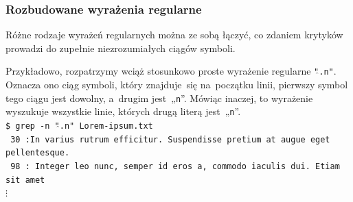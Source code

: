 \documentclass[10pt,t]{beamer}
\begin{document}
\begin{frame}
  \frametitle{Rozbudowane wyrażenia regularne}


  Różne rodzaje wyrażeń regularnych można ze sobą łączyć, co zdaniem
  krytyków prowadzi do zupełnie niezrozumiałych ciągów symboli.

  Przykładowo, rozpatrzymy wciąż stosunkowo proste wyrażenie regularne
  \texttt{"\hspace{0.2em}$\hat{}$\hspace{0.1em}.n"}. Oznacza ono ciąg
  symboli, który znajduje~się na~początku linii, pierwszy symbol tego ciągu
  jest dowolny, a~drugim jest~„\texttt{n}”. Mówiąc inaczej, to wyrażenie
  wyszukuje wszystkie linie, których drugą literą jest~„\texttt{n}”. \\
  \texttt{\$ grep -n "\hspace{0.2em}$\hat{}$\hspace{0.1em}.n"{}
    Lorem-ipsum.txt} \\
  \texttt{{\color{green} 30}{\color{jAxisBlue} :}{\color{red}In} varius
    rutrum efficitur. Suspendisse pretium at augue eget pellentesque.} \\
  \texttt{{\color{green} 98}{\color{jAxisBlue} :}{\color{red} In}teger leo
    nunc, semper id eros a, commodo iaculis dui. Etiam sit amet} \\
  \hspace{1em} $\vdots$

\end{frame}



















\end{document}
